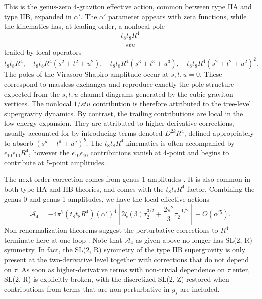 This is the genus-zero 4-graviton effective action, common between type IIA and type IIB, expanded in $\alpha'$.
The $\alpha'$ parameter appears with zeta functions, while the kinematics has, at leading order, a nonlocal pole
\begin{equation}
\frac{t_8t_8 R^4}{stu}
\end{equation}
trailed by local operators
\begin{equation}
t_8t_8 R^4,\quad
t_8t_8 R^4(s^2+t^2+u^2),\quad
t_8t_8 R^4(s^3+t^3+u^3),\quad
t_8t_8 R^4(s^2+t^2+u^2)^2.
\end{equation}
The poles of the Virasoro-Shapiro amplitude occur at $s,t,u=0$. These correspond to massless exchanges and reproduce exactly the pole structure expected from the $s,t,u$-channel diagrams generated by the cubic graviton vertices.
The nonlocal $1/stu$ contribution is therefore attributed to the tree-level supergravity dynamics.
By contrast, the trailing contributions are local in the low-energy expansion.
They are attributed to higher derivative corrections, usually accounted for by introducing terms denoted $D^{2k}R^4$, defined appropriately to absorb $(s^a+t^a+u^a)^b$.
The $t_8t_8R^4$ kinematics is often accompanied by $\epsilon_{10}\epsilon_{10} R^4$, however the $\epsilon_{10}\epsilon_{10}$ contributions vanish at 4-point and begins to contribute at 5-point amplitudes.


The next order correction comes from genus-1 amplitudes \cite{Green:1999pv}.
It is also common in both type IIA and IIB theories, and comes with the $t_8 t_8 R^4$ factor. 
Combining the genus-0 and genus-1 amplitudes, we have the local effective actions
\begin{equation}
\mathcal{A}_4 = -4\pi^7 (t_8 t_8 R^4)(\alpha')^4
\left[
2 \zeta(3)\tau_2^{3/2}
+\frac{2\pi^2}{3}\tau_2^{-1/2}
\right]
+O(\alpha^{\prime 5}).
\end{equation}
Non-renormalization theorems suggest the perturbative corrections to $R^4$ terminate here at one-loop \cite{Green:1997tv,Kehagias:1997cq}.
Note that $\mathcal{A}_4$ as given above no longer has SL(2, R) symmetry. 
In fact, the SL(2, R) symmetry of the type IIB supergravity is only present at the two-derivative level together with corrections that do not depend on $\tau$.
As soon as higher-derivative terms with non-trivial dependence on $\tau$ enter, SL(2, R) is explicitly broken, with the discretized SL(2, Z) restored when contributions from terms that are non-perturbative in $g_s$ are included. 

